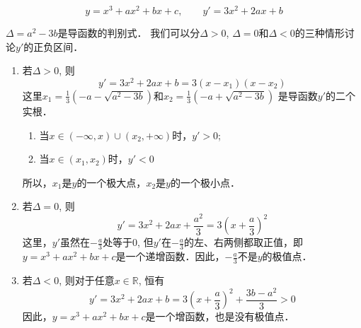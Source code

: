 \begin{solution}
\[y=x^3+ax^2+bx+c,\qquad 
    y'=3x^2+2ax+b\]

$ \Delta=a^2-3b$是导函数的判别式．
    我们可以分$\Delta>0$, $\Delta=0$和$\Delta<0$的三种情形讨论$y'$的正负区间．
\begin{enumerate}
    \item 若$\Delta>0$, 则
\[    y'=3x^2+2ax+b=3 (x-x_1) (x-x_2)\]
    这里$x_1=\frac{1}{3}\left(-a-\sqrt{a^2-3b}\right)$和$x_2=\frac{1}{3}\left(-a+\sqrt{a^2-3b}\right)$
    是导函数$y'$的二个实根．
\begin{enumerate}
    \item 当$x\in (-\infty,x)\cup (x_2,+\infty)$时，$y'>0$;
    \item 当$x\in (x_1,x_2)$时，$y'<0$
\end{enumerate}
    所以，$x_1$是$y$的一个极大点，$x_2$是$y$的一个极小点．
    
\item 若$\Delta=0$, 则
    \[y'=3x^2+2ax+\frac{a^2}{3}=3\left(x+\frac{a}{3}\right)^2\]
这里，$y'$虽然在$-\frac{a}{3}$处等于0, 但$y'$在$-\frac{a}{3}$的左、右两侧都取正值，即$y=x^3+ax^2+bx+c$是一个递增函数．因此，$-\frac{a}{3}$不是$y$的极值点．
\item 若$\Delta<0$, 则对于任意$x\in\mathbb{R}$, 恒有\[y'=3x^2+2ax+b=3 \left(x+\frac{a}{3}\right)^2+\frac{3b-a^2}{3}> 0\]
因此，$y=x^3+ax^2+bx+c$是一个增函数，也是没有极值点．
\end{enumerate}    
\end{solution}

